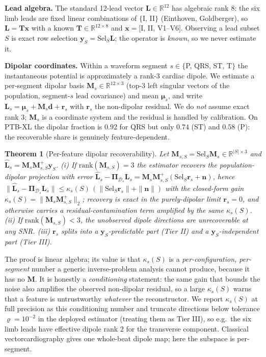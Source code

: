 \documentclass{article}
\newtheorem{theorem}{Theorem}
\newcommand{\dipQRS}{0.92}      %
\newcommand{\dipST}{0.74}       %
\newcommand{\dipP}{0.58}        %
\begin{document}
\textbf{Lead algebra.} The standard 12-lead vector $\bm L\in\mathbb{R}^{12}$ has
algebraic rank $8$: the six limb leads are fixed linear combinations of $\{$I, II$\}$
(Einthoven, Goldberger), so $\bm L=\bm T\bm x$ with a known $\bm T\in\mathbb{R}^{12\times8}$
and $\bm x=[$I, II, V1--V6$]$. Observing a lead subset $S$ is exact row selection
$\bm y_S=\bm{\mathrm{Sel}}_S\bm L$; the operator is \emph{known}, so we never estimate it.

\textbf{Dipolar coordinates.} Within a waveform segment $s\in\{$P, QRS, ST, T$\}$ the
instantaneous potential is approximately a rank-3 cardiac dipole. We estimate a
per-segment dipolar basis $\bm M_s\in\mathbb{R}^{12\times3}$ (top-3 left singular
vectors of the population, segment-$s$ lead covariance) and mean $\bm\mu_s$, and write
$\bm L_s=\bm\mu_s+\bm M_s\bm d+\bm r_s$ with $\bm r_s$ the non-dipolar residual. We do
\emph{not} assume exact rank 3; $\bm M_s$ is a coordinate system and the residual is
handled by calibration. On PTB-XL the dipolar fraction is
$\dipQRS$ for QRS but only $\dipST$ (ST) and $\dipP$ (P): the recoverable share is
genuinely feature-dependent.

\begin{theorem}[Per-feature dipolar recoverability]
\label{thm:main}
Let $\bm M_{s,S}=\bm{\mathrm{Sel}}_S\bm M_s\in\mathbb{R}^{|S|\times3}$ and
$\widehat{\bm L}_s=\bm M_s\bm M_{s,S}^{+}\bm y_S$.
\emph{(i)} If $\mathrm{rank}(\bm M_{s,S})=3$ the estimator recovers the
population-dipolar projection with error
$\widehat{\bm L}_s-\bm\Pi_{\mathcal D_s}\bm L_s=\bm M_s\bm M_{s,S}^{+}(\bm{\mathrm{Sel}}_S\bm r_s+\bm n)$,
hence
$\|\widehat{\bm L}_s-\bm\Pi_{\mathcal D_s}\bm L_s\|\le\kappa_s(S)\,(\|\bm{\mathrm{Sel}}_S\bm r_s\|+\|\bm n\|)$
with the closed-form gain $\kappa_s(S)=\|\bm M_s\bm M_{s,S}^{+}\|_2$; recovery is
\emph{exact} in the purely-dipolar limit $\bm r_s\!=\!0$, and otherwise carries a
residual-contamination term amplified by the same $\kappa_s(S)$.
\emph{(ii)} If $\mathrm{rank}(\bm M_{s,S})<3$, the unobserved dipole directions are
unrecoverable at any SNR. \emph{(iii)} $\bm r_s$ splits into a $\bm y_S$-predictable
part (Tier II) and a $\bm y_S$-independent part (Tier III).
\end{theorem}

The proof is linear algebra; its value is that $\kappa_s(S)$ is a
\emph{per-configuration, per-segment} number a generic inverse-problem analysis cannot
produce, because it has no $\bm M$. It is honestly a \emph{conditioning} statement:
the same gain that bounds the noise also amplifies the observed non-dipolar residual,
so a large $\kappa_s(S)$ warns that a feature is untrustworthy \emph{whatever} the
reconstructor. We report $\kappa_s(S)$ at full precision as this conditioning number
and truncate directions below tolerance $\varrho{=}10^{-2}$ in the deployed estimator
(treating them as Tier III), so e.g.\ the six limb leads have effective dipole rank $2$
for the transverse component. Classical vectorcardiography \cite{edenbrandt1988dower}
gives one whole-beat dipole map; here the subspace is per-segment.
\end{document}
